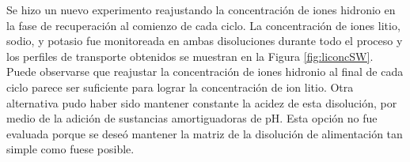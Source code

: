 Se hizo un nuevo experimento reajustando la concentración de iones hidronio en la fase de recuperación al comienzo de cada ciclo. La concentración de iones litio, sodio, y potasio fue monitoreada en ambas disoluciones durante todo el proceso y los perfiles de transporte obtenidos se muestran en la Figura \ref{fig:liconcSW}. Puede observarse que reajustar la concentración de iones hidronio al final de cada ciclo parece ser suficiente para lograr la concentración de ion litio. Otra alternativa pudo haber sido mantener constante la acidez de esta disolución, por medio de la adición de sustancias amortiguadoras de pH. Esta opción no fue evaluada porque se deseó mantener la matriz de la disolución de alimentación tan simple como fuese posible.

\begin{figure}[htbp]
    \centering
    \\
    \\
\end{figure}

